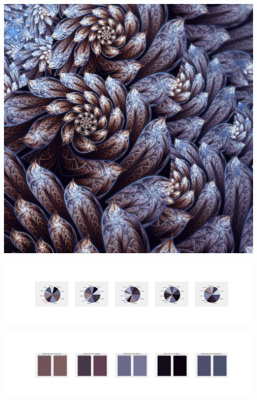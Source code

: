 \documentclass[11pt]{article}
\begin{document}
\begin{landscape}
    \begin{center}
    \includegraphics[width=\textwidth]{./nbimg/file (419).jpg}
    \end{center}

    \begin{center}
    \includegraphics[width=250mm]{./nbimg/pie-355.jpg}
    \end{center}

    \begin{center}
    \includegraphics[width=250mm]{./nbimg/peak-355.jpg}
    \end{center}
    


\end{landscape}
\end{document}
